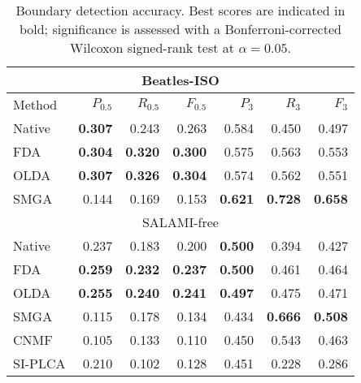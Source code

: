 \begin{table}
\centering
\caption{Boundary detection accuracy. Best scores are indicated in bold; significance is assessed with a Bonferroni-corrected Wilcoxon signed-rank test at $\alpha=0.05$.\label{tab:results}}
\small
\begin{tabular}{lrrrrrr}
\multicolumn{7}{c}{Beatles-ISO}\\
\toprule%
Method & $P_{0.5}$       & $R_{0.5}$         & $F_{0.5}$         & $P_3$             & $R_3$             & $F_3$             \\
\hline
Native  & \textbf{0.307}    & 0.243             & 0.263             & 0.584             & 0.450             & 0.497             \\
FDA     & \textbf{0.304}    & \textbf{0.320}    & \textbf{0.300}    & 0.575             & 0.563             & 0.553             \\
OLDA    & \textbf{0.307}    & \textbf{0.326}    & \textbf{0.304}    & 0.574             & 0.562             & 0.551             \\
\hline
SMGA    & 0.144             & 0.169             & 0.153             & \textbf{0.621}    & \textbf{0.728}    & \textbf{0.658}    \\
\toprule%
\multicolumn{7}{c}{SALAMI-free}\\
\hline
Native  & 0.237             & 0.183             & 0.200             & \textbf{0.500}    & 0.394             & 0.427             \\
FDA     & \textbf{0.259}    & \textbf{0.232}    & \textbf{0.237}    & \textbf{0.500}    & 0.461             & 0.464             \\
OLDA    & \textbf{0.255}    & \textbf{0.240}    & \textbf{0.241}    & \textbf{0.497}    & 0.475             & 0.471             \\
\hline
SMGA    & 0.115             & 0.178             & 0.134             & 0.434             & \textbf{0.666}    & \textbf{0.508}    \\
CNMF    & 0.105             & 0.133             & 0.110             & 0.450             & 0.543             & 0.463             \\
SI-PLCA & 0.210             & 0.102             & 0.128             & 0.451             & 0.228             & 0.286             \\
\bottomrule%
\end{tabular}
\end{table}
